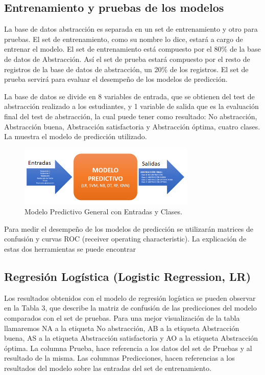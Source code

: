 \documentclass[spanish]{textolivre}
\begin{document}
\subsection{Entrenamiento y pruebas de los modelos}
La base de datos abstracción es separada en un set de entrenamiento y otro para pruebas. El set de entrenamiento, como su nombre lo dice, estará a cargo de entrenar el modelo. El set de entrenamiento está compuesto por el 80\% de la base de datos de Abstracción. Así el set de prueba estará compuesto por el resto de registros de la base de datos de abstracción, un 20\% de los registros. El set de prueba servirá para evaluar el desempeño de los modelos de predicción.

La base de datos se divide en 8 variables de entrada, que se obtienen del test de abstracción realizado a los estudiantes, y 1 variable de salida que es la evaluación final del test de abstracción, la cual puede tener como resultado: No abstracción, Abstracción buena, Abstracción satisfactoria y Abstracción óptima, cuatro clases. La  muestra el modelo de predicción utilizado.

\begin{figure}[htbp]
 \centering
 \includegraphics[width=0.75\textwidth]{figura7.png}
 \caption{Modelo Predictivo General con Entradas y Clases.}
 \label{figura7}
\end{figure}

Para medir el desempeño de los modelos de predicción se utilizarán matrices de confusión y curvas ROC (receiver operating characteristic). La explicación de estas dos herramientas se puede encontrar \cite{chambers1992} %

\subsection{Regresión Logística (Logistic Regression, LR)}
Los resultados obtenidos con el modelo de regresión logística se pueden observar en la Tabla 3, que describe la matriz de confusión de las predicciones del modelo comparados con el set de pruebas. Para una mejor visualización de la tabla llamaremos NA a la etiqueta No abstracción, AB a la etiqueta Abstracción buena, AS a la etiqueta Abstracción satisfactoria y AO a la etiqueta Abstracción óptima. La columna Prueba, hace referencia a los datos del set de Pruebas y al resultado de la misma. Las columnas Predicciones, hacen referencias a los resultados del modelo sobre las entradas del set de entrenamiento.
\end{document}
